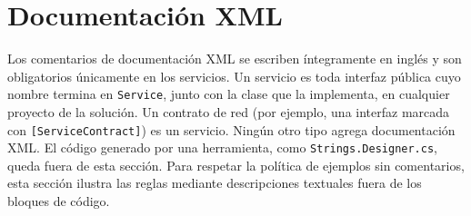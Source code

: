 \section{Documentación XML}

Los comentarios de documentación XML se escriben íntegramente en inglés y son obligatorios únicamente en los servicios. Un servicio es toda interfaz pública cuyo nombre termina en \texttt{Service}, junto con la clase que la implementa, en cualquier proyecto de la solución. Un contrato de red (por ejemplo, una interfaz marcada con \texttt{[ServiceContract]}) es un servicio. Ningún otro tipo agrega documentación XML. El código generado por una herramienta, como \texttt{Strings.Designer.cs}, queda fuera de esta sección. Para respetar la política de ejemplos sin comentarios, esta sección ilustra las reglas mediante descripciones textuales fuera de los bloques de código.




